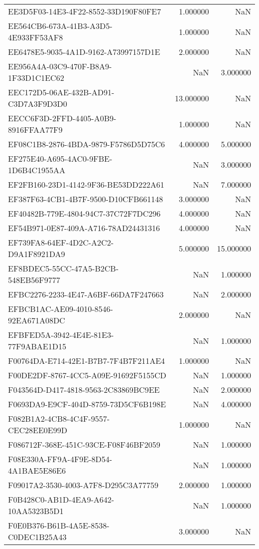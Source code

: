 \begin{tabular}{lrr}
EE3D5F03-14E3-4F22-8552-33D190F80FE7 & 1.000000 & NaN \\
EE564CB6-673A-41B3-A3D5-4E933FF53AF8 & 1.000000 & NaN \\
EE6478E5-9035-4A1D-9162-A73997157D1E & 2.000000 & NaN \\
EE956A4A-03C9-470F-B8A9-1F33D1C1EC62 & NaN & 3.000000 \\
EEC172D5-06AE-432B-AD91-C3D7A3F9D3D0 & 13.000000 & NaN \\
EECC6F3D-2FFD-4405-A0B9-8916FFAA77F9 & 1.000000 & NaN \\
EF08C1B8-2876-4BDA-9879-F5786D5D75C6 & 4.000000 & 5.000000 \\
EF275E40-A695-4AC0-9FBE-1D6B4C1955AA & NaN & 3.000000 \\
EF2FB160-23D1-4142-9F36-BE53DD222A61 & NaN & 7.000000 \\
EF387F63-4CB1-4B7F-9500-D10CFB661148 & 3.000000 & NaN \\
EF40482B-779E-4804-94C7-37C72F7DC296 & 4.000000 & NaN \\
EF54B971-0E87-409A-A716-78AD24431316 & 4.000000 & NaN \\
EF739FA8-64EF-4D2C-A2C2-D9A1F8921DA9 & 5.000000 & 15.000000 \\
EF8BDEC5-55CC-47A5-B2CB-548EB56F9777 & NaN & 1.000000 \\
EFBC2276-2233-4E47-A6BF-66DA7F247663 & NaN & 2.000000 \\
EFBCB1AC-AE09-4010-8546-92EA671A08DC & 2.000000 & NaN \\
EFBFED5A-3942-4E4E-81E3-77F9ABAE1D15 & NaN & 1.000000 \\
F00764DA-E714-42E1-B7B7-7F4B7F211AE4 & 1.000000 & NaN \\
F00DE2DF-8767-4CC5-A09E-91692F5155CD & NaN & 1.000000 \\
F043564D-D417-4818-9563-2C83869BC9EE & NaN & 2.000000 \\
F0693DA9-E9CF-404D-8759-73D5CF6B198E & NaN & 4.000000 \\
F082B1A2-4CB8-4C4F-9557-CEC28EE0E99D & 1.000000 & NaN \\
F086712F-368E-451C-93CE-F08F46BF2059 & NaN & 1.000000 \\
F08E330A-FF9A-4F9E-8D54-4A1BAE5E86E6 & NaN & 1.000000 \\
F09017A2-3530-4003-A7F8-D295C3A77759 & 2.000000 & 1.000000 \\
F0B428C0-AB1D-4EA9-A642-10AA5323B5D1 & NaN & 1.000000 \\
F0E0B376-B61B-4A5E-8538-C0DEC1B25A43 & 3.000000 & NaN \\

\end{tabular}
